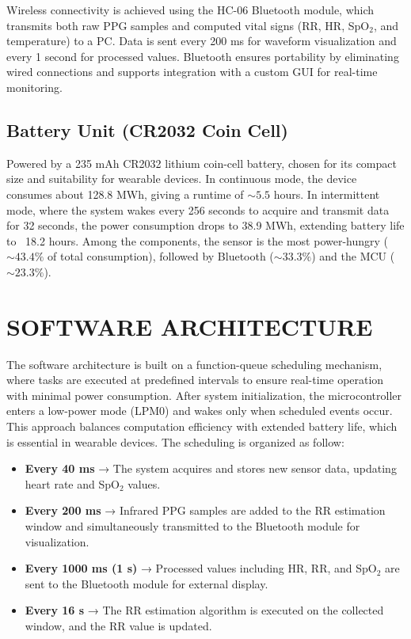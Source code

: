 \documentclass[12pt,a4paper]{report}
\begin{document}
Wireless connectivity is achieved using the HC-06 Bluetooth module, which transmits both raw PPG samples and computed vital signs (RR, HR, SpO$_2$, and temperature) to a PC. Data is sent every 200 ms for waveform visualization and every 1 second for processed values. Bluetooth ensures portability by eliminating wired connections and supports integration with a custom GUI for real-time monitoring.


\subsection{Battery Unit (CR2032 Coin Cell)}

Powered by a 235 mAh CR2032 lithium coin-cell battery, chosen for its compact size and suitability for wearable devices. In continuous mode, the device consumes about 128.8 MWh, giving a runtime of $\sim5.5$ hours. In intermittent mode, where the system wakes every 256 seconds to acquire and transmit data for 32 seconds, the power consumption drops to 38.9 MWh, extending battery life to ~18.2 hours. Among the components, the sensor is the most power-hungry ($\sim43.4\%$ of total consumption), followed by Bluetooth ($\sim33.3\%$) and the MCU ($\sim23.3\%$).




 
\section{\large{SOFTWARE ARCHITECTURE}}


The software architecture is built on a function-queue scheduling mechanism, where tasks are executed at predefined intervals to ensure real-time operation with minimal power consumption\cite{simon1999survey}. After system initialization, the microcontroller enters a low-power mode (LPM0) and wakes only when scheduled events occur. This approach balances computation efficiency with extended battery life, which is essential in wearable devices.
The scheduling is organized as follow:

\begin{itemize}

    \item \textbf{Every 40 ms} → The system acquires and stores new sensor data, updating heart rate and SpO$_2$ values.

    \item \textbf{Every 200 ms} → Infrared PPG samples are added to the RR estimation window and simultaneously transmitted to the Bluetooth module for visualization.

    \item \textbf{Every 1000 ms (1 s)} → Processed values including HR, RR, and SpO$_2$ are sent to the Bluetooth module for external display.

    \item \textbf{Every 16 s }→ The RR estimation algorithm is executed on the collected window, and the RR value is updated.
\end{itemize}
\end{document}
